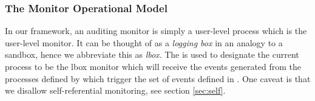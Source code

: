
% 
% 
% 
% 
% 
% 

\subsubsection{The Monitor Operational Model}

In our framework, an auditing monitor is simply a user-level process
which is the user-level monitor.
It can be thought of as a {\em logging box} in an analogy to
a sandbox, hence we abbreviate this as {\em lbox}.
The  is used to designate
the current process to be the lbox monitor which will
receive the events generated from the processes defined by 
which trigger the set of events defined in .
One caveat is that we disallow self-referential monitoring, see
section \ref{sec:self}.

